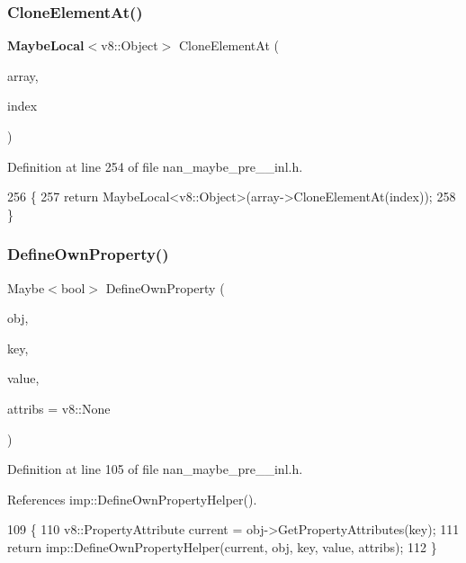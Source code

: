 \subsubsection{Clone\+Element\+At()}
{\footnotesize\ttfamily \textbf{ Maybe\+Local}$<$v8\+::\+Object$>$ Clone\+Element\+At (\begin{DoxyParamCaption}\item[{v8\+::\+Handle$<$ v8\+::\+Array $>$}]{array,  }\item[{uint32\+\_\+t}]{index }\end{DoxyParamCaption})}



Definition at line 254 of file nan\+\_\+maybe\+\_\+pre\+\_\+\_\+inl.\+h.


\begin{DoxyCode}
256                     \{
257   \textcolor{keywordflow}{return} MaybeLocal<v8::Object>(array->CloneElementAt(index));
258 \}
\end{DoxyCode}
\mbox{\label{nan__maybe__pre__43__inl_8h_a545b79091560bf957d6ef124f5bc74b3}} 
\subsubsection{Define\+Own\+Property()}
{\footnotesize\ttfamily Maybe$<$bool$>$ Define\+Own\+Property (\begin{DoxyParamCaption}\item[{v8\+::\+Handle$<$ v8\+::\+Object $>$}]{obj,  }\item[{v8\+::\+Handle$<$ v8\+::\+String $>$}]{key,  }\item[{v8\+::\+Handle$<$ v8\+::\+Value $>$}]{value,  }\item[{v8\+::\+Property\+Attribute}]{attribs = {\ttfamily v8\+:\+:None} }\end{DoxyParamCaption})}



Definition at line 105 of file nan\+\_\+maybe\+\_\+pre\+\_\+\_\+inl.\+h.



References imp\+::\+Define\+Own\+Property\+Helper().


\begin{DoxyCode}
109                                           \{
110   v8::PropertyAttribute current = obj->GetPropertyAttributes(key);
111   \textcolor{keywordflow}{return} imp::DefineOwnPropertyHelper(current, obj, key, value, attribs);
112 \}
\end{DoxyCode}
\mbox{\label{nan__maybe__pre__43__inl_8h_aaf4750f3880975364e48a1997c0d6a41}} 
